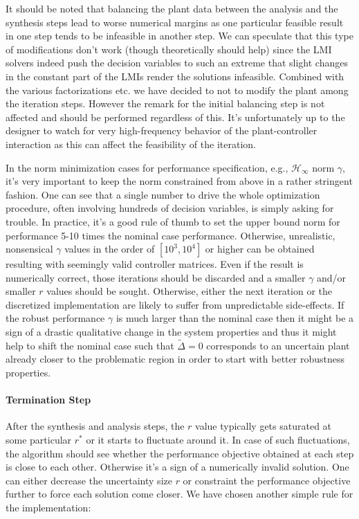 \begin{rem} It should be noted that balancing the plant data between the analysis and the synthesis steps lead to 
worse numerical margins as one particular feasible result in one step tends to be infeasible in another step. We can speculate 
that this type of modifications don't work (though theoretically should help) since the LMI solvers indeed push the 
decision variables to such an extreme that slight changes in the constant part of the LMIs render the solutions 
infeasible. Combined with the various factorizations etc. we have decided to not to modify the plant among the 
iteration steps. However the remark for the initial balancing step is not affected and should be performed regardless 
of this. It's unfortunately up to the designer to watch for very high-frequency behavior of the plant-controller
interaction as this can affect the feasibility of the iteration. 
\end{rem}

\begin{rem} In the norm minimization cases for performance specification, e.g., $\mathcal{H}_\infty$ norm $\gamma$,
it's very important to keep the norm constrained from above in a  rather stringent fashion. One can see that a single
number to drive the whole optimization procedure, often involving hundreds of decision variables, is simply asking for 
trouble. In practice, it's a good rule of thumb to set the upper bound norm for performance 5-10 times the nominal case
performance. Otherwise, unrealistic, nonsensical $\gamma$ values in the order of $[10^3,10^4]$ or higher can be obtained
resulting with seemingly valid controller matrices. Even if the result is numerically correct, those iterations should be
discarded and a smaller $\gamma$ and/or smaller $r$ values should be sought. Otherwise, either the next iteration or the
discretized implementation are likely to suffer from unpredictable side-effects. If the robust performance $\gamma$ is 
much larger than the nominal case then it might be a sign of a drastic qualitative change in the system properties and 
thus it might help to shift the nominal case such that $\tilde{\Delta}=0$ corresponds to an uncertain plant already 
closer to the problematic region in order to start with better robustness properties. 
\end{rem}


\paragraph{Termination Step} After the synthesis and analysis steps, the $r$ value typically gets saturated at some 
particular $r^*$ or it starts to fluctuate around it. In case of such fluctuations, the algorithm should see whether
the performance objective obtained at each step is close to each other. Otherwise it's a sign of a numerically invalid
solution. One can either decrease the uncertainty size $r$ or constraint the performance objective further to force 
each solution come closer. We have chosen another simple rule for the implementation:


